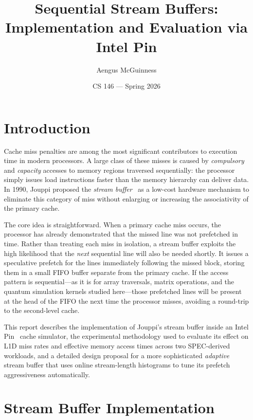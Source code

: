 \documentclass[10pt,twocolumn]{article}
\title{\textbf{Sequential Stream Buffers: \\
       Implementation and Evaluation via Intel Pin}}
\author{Aengus McGuinness}
\date{CS 146 --- Spring 2026}
\begin{document}
\maketitle

\section{Introduction}

Cache miss penalties are among the most significant contributors to
execution time in modern processors. A large class of these misses is
caused by \textit{compulsory} and \textit{capacity} accesses to memory
regions traversed sequentially: the processor simply issues load
instructions faster than the memory hierarchy can deliver data. In 1990,
Jouppi proposed the \textit{stream buffer}~\cite{jouppi1990} as a
low-cost hardware mechanism to eliminate this category of miss without
enlarging or increasing the associativity of the primary cache.

The core idea is straightforward. When a primary cache miss occurs, the
processor has already demonstrated that the missed line was not prefetched
in time. Rather than treating each miss in isolation, a stream buffer
exploits the high likelihood that the \textit{next} sequential line will
also be needed shortly. It issues a speculative prefetch for the lines
immediately following the missed block, storing them in a small FIFO
buffer separate from the primary cache. If the access pattern is
sequential---as it is for array traversals, matrix operations, and the
quantum simulation kernels studied here---those prefetched lines will be
present at the head of the FIFO the next time the processor misses,
avoiding a round-trip to the second-level cache.

This report describes the implementation of Jouppi's stream buffer inside
an Intel Pin~\cite{pin} cache simulator, the experimental methodology
used to evaluate its effect on L1D miss rates and effective memory access
times across two SPEC-derived workloads, and a detailed design proposal
for a more sophisticated \textit{adaptive} stream buffer that uses
online stream-length histograms to tune its prefetch aggressiveness
automatically.

\section{Stream Buffer Implementation}
\end{document}
